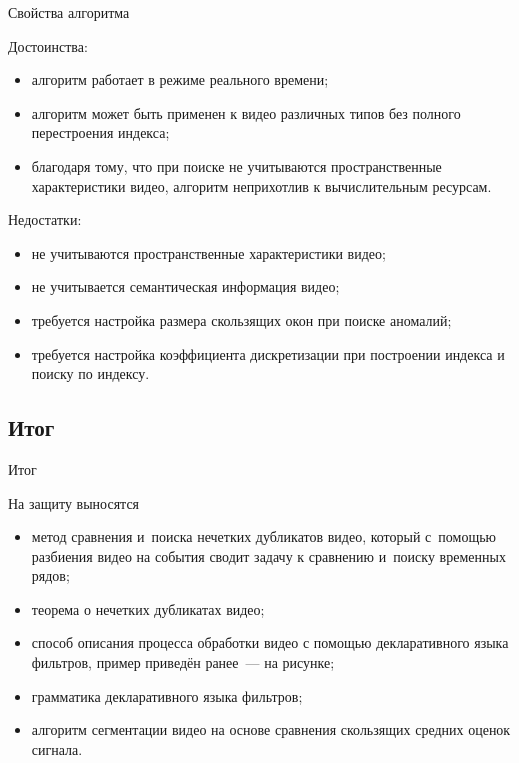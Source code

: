 \begin{frame}{Свойства алгоритма}
    \begin{orange-box}{Достоинства:}
        \small
        \begin{itemize}
        \item алгоритм работает в режиме реального времени;
        \item алгоритм может быть применен 
        к видео различных типов без полного 
        перестроения индекса;
        \item благодаря тому, что при поиске не учитываются 
        пространственные характеристики видео, 
        алгоритм неприхотлив к вычислительным ресурсам.
        \end{itemize}
    \end{orange-box}
    \vspace{12pt}
    \begin{orange-box}{Недостатки:}
        \small
        \begin{itemize}
            \item   не учитываются 
                    пространственные характеристики видео;
            \item   не учитывается
                    семантическая информация видео;
            \item   требуется настройка размера скользящих 
                    окон при поиске аномалий;
            \item   требуется настройка коэффициента дискретизации 
                    при построении индекса и поиску по индексу.
        \end{itemize}
    \end{orange-box}
\end{frame}

\subsection{Итог}

\begin{frame}{Итог}
   \begin{orange-box}{На защиту выносятся}
        \begin{itemize}
            \item 
                метод сравнения и~поиска нечетких дубликатов видео, 
                который с~помощью разбиения видео на события 
                сводит задачу к сравнению и~поиску временных рядов; 
            \item
                теорема о нечетких дубликатах видео;
            \item
                способ описания процесса обработки видео
                с помощью декларативного языка фильтров, 
                пример приведён ранее~— на рисунке;
            \item 
                грамматика декларативного языка фильтров;
            \item
                алгоритм сегментации видео
                на основе сравнения скользящих 
                средних оценок сигнала.
        \end{itemize}
    \end{orange-box}
\end{frame}

